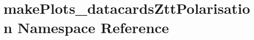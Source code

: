 \hypertarget{namespacemakePlots__datacardsZttPolarisation}{
\section{makePlots\_\-datacardsZttPolarisation Namespace Reference}
\label{namespacemakePlots__datacardsZttPolarisation}
}
